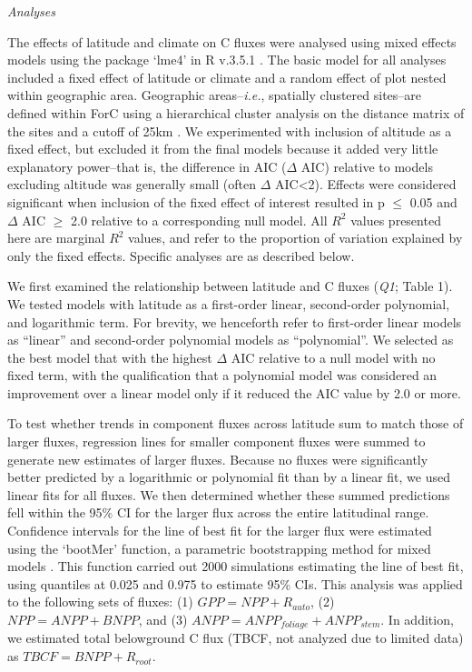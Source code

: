 \documentclass[
]{article}
\begin{document}
\emph{Analyses}

The effects of latitude and climate on C fluxes were analysed using
mixed effects models using the package `lme4' \citep{bates_fitting_2015}
in R v.3.5.1 \citep{r_core_team_r:_2018}. The basic model for all
analyses included a fixed effect of latitude or climate and a random
effect of plot nested within geographic area. Geographic
areas--\emph{i.e.}, spatially clustered sites--are defined within ForC
using a hierarchical cluster analysis on the distance matrix of the
sites and a cutoff of 25km \citep{anderson-teixeira_forc_2018}. We
experimented with inclusion of altitude as a fixed effect, but excluded
it from the final models because it added very little explanatory
power--that is, the difference in AIC (\(\Delta\) AIC) relative to
models excluding altitude was generally small (often \(\Delta\)
AIC\textless2). Effects were considered significant when inclusion of
the fixed effect of interest resulted in p \(\le\) 0.05 and \(\Delta\)
AIC \(\ge\) 2.0 relative to a corresponding null model. All \(R^2\)
values presented here are marginal \(R^2\) values, and refer to the
proportion of variation explained by only the fixed effects. Specific
analyses are as described below.

We first examined the relationship between latitude and C fluxes
(\emph{Q1}; Table 1). We tested models with latitude as a first-order
linear, second-order polynomial, and logarithmic term. For brevity, we
henceforth refer to first-order linear models as ``linear'' and
second-order polynomial models as ``polynomial''. We selected as the
best model that with the highest \(\Delta\) AIC relative to a null model
with no fixed term, with the qualification that a polynomial model was
considered an improvement over a linear model only if it reduced the AIC
value by 2.0 or more.

To test whether trends in component fluxes across latitude sum to match
those of larger fluxes, regression lines for smaller component fluxes
were summed to generate new estimates of larger fluxes. Because no
fluxes were significantly better predicted by a logarithmic or
polynomial fit than by a linear fit, we used linear fits for all fluxes.
We then determined whether these summed predictions fell within the 95\%
CI for the larger flux across the entire latitudinal range. Confidence
intervals for the line of best fit for the larger flux were estimated
using the `bootMer' function, a parametric bootstrapping method for
mixed models \citep{bates_fitting_2015}. This function carried out 2000
simulations estimating the line of best fit, using quantiles at 0.025
and 0.975 to estimate 95\% CIs. This analysis was applied to the
following sets of fluxes: (1) \(GPP = NPP + R_{auto}\), (2)
\(NPP = ANPP + BNPP\), and (3) \(ANPP = ANPP_{foliage} + ANPP_{stem}\).
In addition, we estimated total belowground C flux (TBCF, not analyzed
due to limited data) as \(TBCF = BNPP + R_{root}\).
\end{document}
